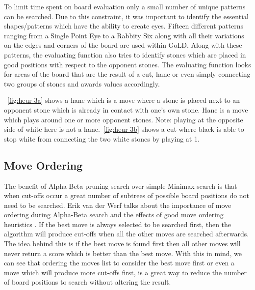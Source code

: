 \documentclass{l4proj}
\begin{document}
To limit time spent on board evaluation only a small number of unique patterns can be searched. Due to this constraint, it was important to identify the essential shapes/patterns which have the ability to create eyes. Fifteen different patterns ranging from a Single Point Eye to a Rabbity Six along with all their variations on the edges and corners of the board are used within GoLD.  Along with these patterns, the evaluating function also tries to identify stones which are placed in good positions with respect to the opponent stones. The evaluating function looks for areas of the board that are the result of a cut, hane or even simply connecting two groups of stones and awards values accordingly.



~\autoref{fig:heur-3a} shows a hane which is a move where a stone is placed next to an opponent stone which is already in contact with one’s own stone. Hane is a move which plays around one or more opponent stones. Note: playing at the opposite side of white here is not a hane.~\autoref{fig:heur-3b} shows a cut where black is able to stop white from connecting the two white stones by playing at 1.






\subsection{Move Ordering}
The benefit of Alpha-Beta pruning search over simple Minimax search is that when cut-offs occur a great number of subtrees of possible board positions do not need to be searched. Erik van der Werf talks about the importance of move ordering during Alpha-Beta search and the effects of good move ordering heuristics \cite{Kranenburg2001}. If the best move is always selected to be searched first, then the algorithm will produce cut-offs when all the other moves are searched afterwards. The idea behind this is if the best move is found first then all other moves will never return a score which is better than the best move. With this in mind, we can see that ordering the moves list to consider the best move first or even a move which will produce more cut-offs first, is a great way to reduce the number of board positions to search without altering the result.
\end{document}
